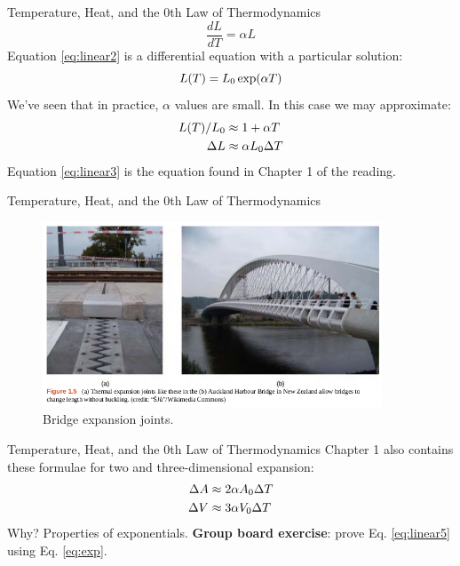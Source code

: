 \documentclass{beamer}
\begin{document}
\begin{frame}{Temperature, Heat, and the 0th Law of Thermodynamics} 
\begin{equation}
\frac{dL}{dT} = \alpha L
\label{eq:linear2}
\end{equation}
Equation \ref{eq:linear2} is a differential equation with a particular solution:
\begin{equation}
L(T) = L_{\rm 0}\exp(\alpha T) \label{eq:exp}
\end{equation}
We've seen that in practice, $\alpha$ values are small.  In this case we may approximate:
\begin{align}
L(T)/L_{\rm 0} &\approx 1+\alpha T \\
\Delta L &\approx \alpha L_{\rm 0} \Delta T \label{eq:linear3}
\end{align}
Equation \ref{eq:linear3} is the equation found in Chapter 1 of the reading.
\end{frame}

\begin{frame}{Temperature, Heat, and the 0th Law of Thermodynamics}
\begin{figure}
\centering
\includegraphics[width=0.9\textwidth]{figures/bridge.png}
\caption{\label{fig:bridge} Bridge expansion joints.}
\end{figure}
\end{frame}

\begin{frame}{Temperature, Heat, and the 0th Law of Thermodynamics} 
Chapter 1 also contains these formulae for two and three-dimensional expansion:
\begin{align}
\Delta A &\approx 2\alpha A_{\rm 0} \Delta T \label{eq:linear4} \\
\Delta V &\approx 3\alpha V_{\rm 0} \Delta T \label{eq:linear5}
\end{align}
Why?  Properties of exponentials.  \textbf{Group board exercise}: prove Eq. \ref{eq:linear5} using Eq. \ref{eq:exp}.
\end{frame}
\end{document}
